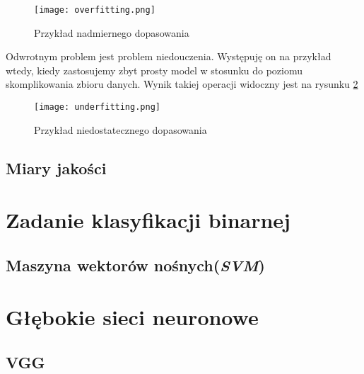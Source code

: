 \begin{figure}[h!]
	\texttt{[image: overfitting.png]}
	\centering
	\caption{Przykład nadmiernego dopasowania}
	\label{fig:overfitting}
\end{figure}

Odwrotnym problem jest problem niedouczenia. Występuję on na przykład wtedy, kiedy zastosujemy zbyt prosty model w stosunku do poziomu skomplikowania zbioru danych. Wynik takiej operacji widoczny jest na rysunku \ref{fig:underfitting} 

\begin{figure}[h!]
	\texttt{[image: underfitting.png]}
	\centering
	\caption{Przykład niedostatecznego dopasowania}
	\label{fig:underfitting}
\end{figure}

\subsection{Miary jakości}

\section{Zadanie klasyfikacji binarnej}

\subsection{Maszyna wektorów nośnych(\textit{SVM})}

\section{Głębokie sieci neuronowe}

\subsection{VGG}



























